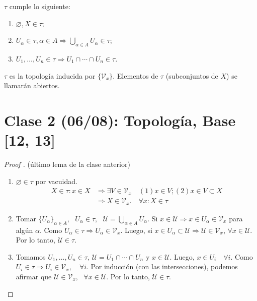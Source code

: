 \documentclass[a4paper]{report}
\begin{document}
	\begin{lemma}
		$\tau$ cumple lo siguiente:

		\begin{enumerate}
			\item $\varnothing, X \in \tau$;

			\item $U_{\alpha} \in \tau, \alpha \in A \Rightarrow \bigcup_{\alpha \in A} U_{\alpha} \in \tau$;

			\item $U_1,\dots,U_n \in \tau \Rightarrow U_1 \cap \cdots \cap U_n \in \tau$.
		\end{enumerate}
	\end{lemma}

	$\tau$ es la topología inducida por $\{ \mathcal{V}_x \}$. Elementos de $\tau$ (subconjuntos de $X$) se llamarán abiertos.


	\section{Clase 2 (06/08): Topología, Base [12, 13]}

	\begin{proof}[Proof ] (último lema de la clase anterior)
		\begin{enumerate}
			\item $\varnothing \in \tau$ por vacuidad.
			\begin{align*}
				X \in \tau : x \in X & \Rightarrow \exists V \in \mathcal{V}_x \quad (1) x \in V; (2) x \in V \subset X \\ & \Rightarrow X \in \mathcal{V}_x. \quad \forall x : X \in \tau 
			\end{align*}

			\item Tomar $\{ U_{\alpha} \}_{\alpha \in A}, \text{ } U_{\alpha} \in \tau, \text{ } \mathcal{U} = \bigcup_{\alpha \in A} U_{\alpha}$. Si $x \in \mathcal{U} \Rightarrow x \in U_{\alpha} \in \mathcal{V}_x$ para algún $\alpha$. Como $U_{\alpha} \in \tau \Rightarrow U_{\alpha} \in \mathcal{V}_x$. Luego, si $x \in U_{\alpha} \subset \mathcal{U} \Rightarrow \mathcal{U} \in \mathcal{V}_x$, $\forall x \in \mathcal{U}$. Por lo tanto, $\mathcal{U} \in \tau$.

			\item Tomamos $U_1,\dots,U_n \in \tau$, $\mathcal{U} = U_1 \cap \cdots \cap U_n$ y $x \in \mathcal{U}$. Luego, $x \in U_i \quad \forall i$. Como $U_i \in \tau \Rightarrow U_i \in \mathcal{V}_x, \quad \forall i$. Por inducción (con las intersecciones), podemos afirmar que $\mathcal{U} \in \mathcal{V}_x, \text{ } \forall x \in \mathcal{U}$. Por lo tanto, $\mathcal{U} \in \tau$. 
		\end{enumerate}
	\end{proof}
\end{document}
